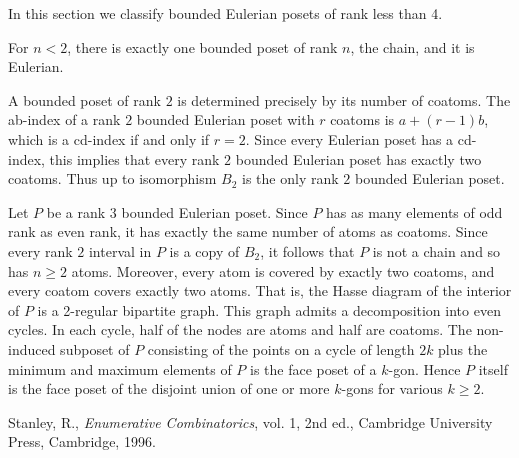 \documentclass[12pt]{article}
\begin{document}
In this section we classify bounded Eulerian posets of rank less than 4.

For $n<2$, there is exactly one bounded poset of rank $n$, the chain,
and it is Eulerian.

A bounded poset of rank $2$ is determined precisely by its number of
coatoms.  The ab-index of a rank $2$ bounded Eulerian poset with $r$
coatoms is $a + (r-1)b$, which is a cd-index if and only if $r=2$.
Since every Eulerian poset has a cd-index, this implies that every
rank $2$ bounded Eulerian poset has exactly two coatoms.  Thus up to
isomorphism $B_2$ is the only rank $2$ bounded Eulerian poset.

Let $P$ be a rank $3$ bounded Eulerian poset.  Since $P$ has as many
elements of odd rank as even rank, it has exactly the same number of
atoms as coatoms.  Since every rank $2$ interval in $P$ is a copy of
$B_2$, it follows that $P$ is not a chain and so has $n\ge 2$ atoms.
Moreover, every atom is covered by exactly two coatoms, and every
coatom covers exactly two atoms.  That is, the Hasse diagram of the
interior of $P$ is a 2-regular bipartite graph.  This graph admits a
decomposition into even cycles.  In each cycle, half of the nodes are
atoms and half are coatoms.  The non-induced subposet of $P$
consisting of the points on a cycle of length $2k$ plus the minimum
and maximum elements of $P$ is the face poset of a $k$-gon.  Hence $P$
itself is the face poset of the disjoint union of one or more $k$-gons
for various $k\ge 2$.

\begin{thebibliography}{1}
Stanley, R., \emph{Enumerative Combinatorics}, vol. 1, 2nd ed., Cambridge
University Press, Cambridge, 1996.
\end{thebibliography}

\end{document}
